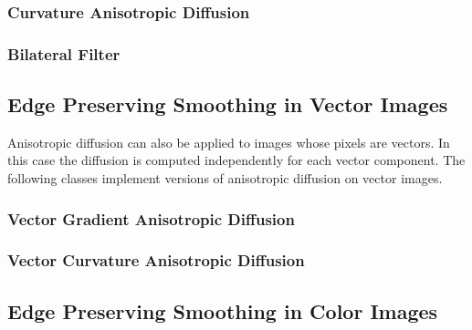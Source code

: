 %



\subsubsection{Curvature Anisotropic Diffusion}
\label{sec:CurvatureAnisotropicDiffusionImageFilter}

%


\subsubsection{Bilateral Filter}
\label{sec:BilateralImageFilter}

%



\subsection{Edge Preserving Smoothing in Vector Images}
\label{sec:VectorAnisotropicDiffusion}

Anisotropic diffusion can also be applied to images whose pixels are vectors.
In this case the diffusion is computed independently for each vector component.
The following classes implement versions of anisotropic diffusion on vector images.


\subsubsection{Vector Gradient Anisotropic Diffusion}
\label{sec:VectorGradientAnisotropicDiffusionImageFilter}

%

\subsubsection{Vector Curvature Anisotropic Diffusion}
\label{sec:VectorCurvatureAnisotropicDiffusionImageFilter}

%



\subsection{Edge Preserving Smoothing in Color Images}
\label{sec:ColorAnisotropicDiffusion}

